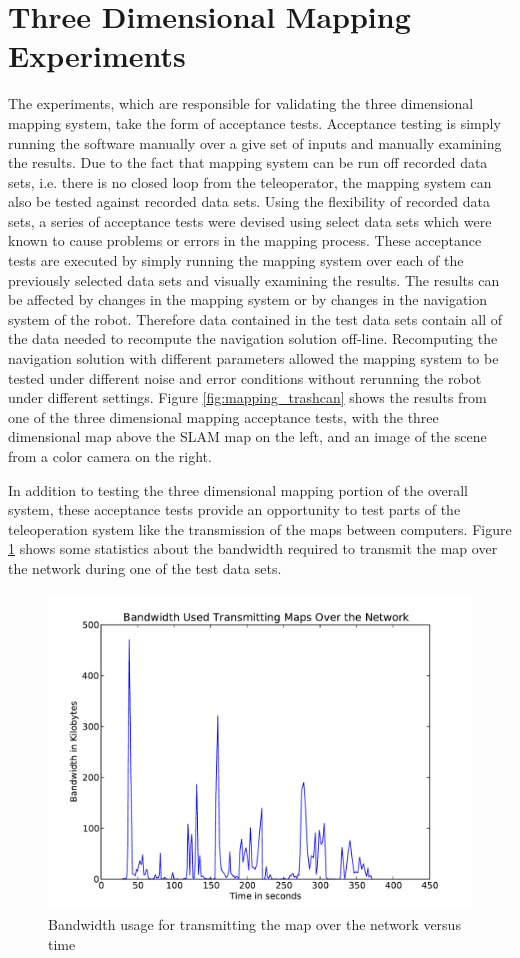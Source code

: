 \documentclass[12pt]{report}
\begin{document}
\section{Three Dimensional Mapping Experiments}
The experiments, which are responsible for validating the three dimensional mapping system, take the form of acceptance tests.  Acceptance testing is simply running the software manually over a give set of inputs and manually examining the results.  Due to the fact that mapping system can be run off recorded data sets, i.e. there is no closed loop from the teleoperator, the mapping system can also be tested against recorded data sets.  Using the flexibility of recorded data sets, a series of acceptance tests were devised using select data sets which were known to cause problems or errors in the mapping process.  These acceptance tests are executed by simply running the mapping system over each of the previously selected data sets and visually examining the results.  The results can be affected by changes in the mapping system or by changes in the navigation system of the robot.  Therefore data contained in the test data sets contain all of the data needed to recompute the navigation solution off-line.  Recomputing the navigation solution with different parameters allowed the mapping system to be tested under different noise and error conditions without rerunning the robot under different settings.  Figure \ref{fig:mapping_trashcan} shows the results from one of the three dimensional mapping acceptance tests, with the three dimensional map above the SLAM map on the left, and an image of the scene from a color camera on the right.

In addition to testing the three dimensional mapping portion of the overall system, these acceptance tests provide an opportunity to test parts of the teleoperation system like the transmission of the maps between computers.  Figure \ref{fig:map_bandwidth} shows some statistics about the bandwidth required to transmit the map over the network during one of the test data sets.

\begin{figure}[ht]
  \centering
  \includegraphics[width=6.5in,keepaspectratio]{map_bandwidth.pdf}
  \caption{Bandwidth usage for transmitting the map over the network versus time}
  \label{fig:map_bandwidth}
\end{figure}
\end{document}
